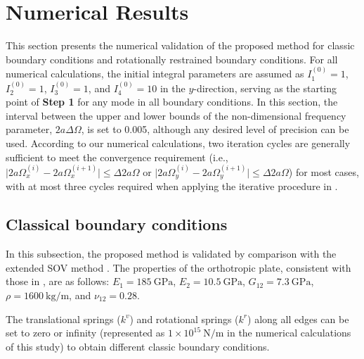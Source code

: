 \documentclass[preprint,12pt]{elsarticle}
\newcommand{\urho}{~\unit{\kilogram\per\meter}\xspace}
\newcommand{\ustif}{~\unit{\newton\per\metre}\xspace}
\newcommand{\nugpa}{~\si{\giga\pascal}\xspace}
\begin{document}
\FloatBarrier
\section{Numerical Results}  
This section presents the numerical validation of the proposed method for classic boundary conditions and rotationally restrained boundary conditions.  
For all numerical calculations, the initial integral parameters are assumed as $I^{(0)}_1=1$, $I^{(0)}_2=1$, $I^{(0)}_3=1$, and $I^{(0)}_4=10$ in the $y$-direction, serving as the starting point of \textbf{Step 1} for any mode in all boundary conditions.  
In this section, the interval between the upper and lower bounds of the non-dimensional frequency parameter, $2a\Delta\Omega$, is set to 0.005, although any desired level of precision can be used.
According to our numerical calculations, two iteration cycles are generally sufficient to meet the convergence requirement (i.e., $\lvert 2a\Omega^{(i)}_{x} - 2a\Omega^{(i+1)}_{x} \rvert \leq \Delta 2a\Omega$ or $\lvert 2a\Omega^{(i)}_{y} - 2a\Omega^{(i+1)}_{y} \rvert \leq \Delta 2a\Omega$) for most cases, with at most three cycles required when applying the iterative procedure in .
 
 

\subsection{Classical boundary conditions}
In this subsection, the proposed method is validated by comparison with the extended SOV method \cite{xing2020extended}.  
The properties of the orthotropic plate, consistent with those in \cite{xing2020extended}, are as follows:  
$E_1 = 185 \nugpa$, $E_2 = 10.5 \nugpa$, $G_{12} = 7.3 \nugpa$, $\rho = 1600 \urho$, and $\nu_{12} = 0.28$.
  
The translational springs ($k^v$) and rotational springs ($k^r$) along all edges can be set to zero or infinity (represented as $1 \times 10^{15} \ustif$ in the numerical calculations of this study) to obtain different classic boundary conditions.  
\end{document}
